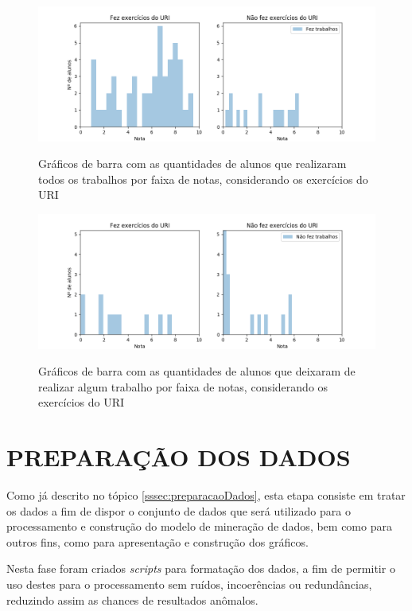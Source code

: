 \begin{figure}[!htb]
    \centering
    \caption{Gráficos de barra com as quantidades de alunos que realizaram todos os trabalhos por faixa de notas, considerando os exercícios do URI}
    \includegraphics[width=1\textwidth]{./dados/figuras/analise/grafico3}
    \label{fig:analise-3}
\end{figure}

\begin{figure}[!htb]
    \centering
    \caption{Gráficos de barra com as quantidades de alunos que deixaram de realizar algum trabalho por faixa de notas, considerando os exercícios do URI}
    \includegraphics[width=1\textwidth]{./dados/figuras/analise/grafico4}
    \label{fig:analise-4}
\end{figure}


\section{PREPARAÇÃO DOS DADOS}

Como já descrito no tópico \ref{sssec:preparacaoDados}, esta etapa consiste em tratar os dados a fim de dispor o conjunto de dados que será utilizado para o processamento e construção do modelo de mineração de dados, bem como para outros fins, como para apresentação e construção dos gráficos.

Nesta fase foram criados \textit{scripts} para formatação dos dados, a fim de permitir o uso destes para o processamento sem ruídos, incoerências ou redundâncias, reduzindo assim as chances de resultados anômalos.

